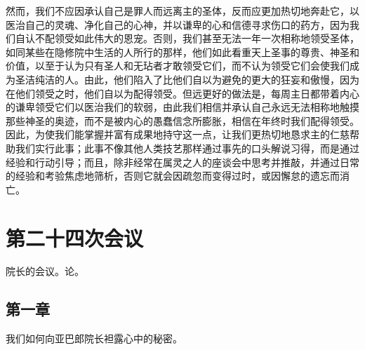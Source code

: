 \par

然而，我们不应因承认自己是罪人而远离主的圣体，反而应更加热切地奔赴它，以医治自己的灵魂、净化自己的心神，并以谦卑的心和信德寻求伤口的药方，因为我们自认不配领受如此伟大的恩宠。否则，我们甚至无法一年一次相称地领受圣体，如同某些在隐修院中生活的人所行的那样，他们如此看重天上圣事的尊贵、神圣和价值，以至于认为只有圣人和无玷者才敢领受它们，而不认为领受它们会使我们成为圣洁纯洁的人。由此，他们陷入了比他们自以为避免的更大的狂妄和傲慢，因为在他们领受之时，他们自以为配得领受。但远更好的做法是，每周主日都带着内心的谦卑领受它们以医治我们的软弱，由此我们相信并承认自己永远无法相称地触摸那些神圣的奥迹，而不是被内心的愚蠢信念所膨胀，相信在年终时我们配得领受。因此，为使我们能掌握并富有成果地持守这一点，让我们更热切地恳求主的仁慈帮助我们实行此事；此事不像其他人类技艺那样通过事先的口头解说习得，而是通过经验和行动引导；而且，除非经常在属灵之人的座谈会中思考并推敲，并通过日常的经验和考验焦虑地筛析，否则它就会因疏忽而变得过时，或因懈怠的遗忘而消亡。\par



\section{第二十四次会议}

\par

院长的会议。论。\par


\subsection{第一章}

我们如何向亚巴郎院长袒露心中的秘密。\par

